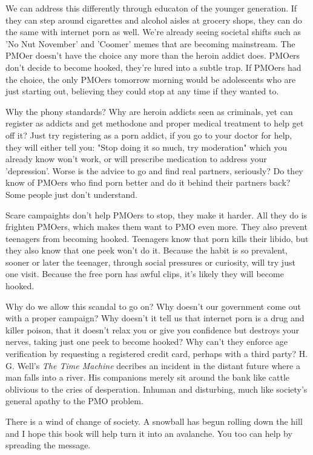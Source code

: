 \documentclass[easypeasy.tex]{subfiles}
\begin{document}
We can address this differently through educaton of the younger generation. If they can step around cigarettes and alcohol aisles at grocery shops, they can do the same with internet porn as well. We're already seeing societal shifts such as 'No Nut November' and 'Coomer' memes that are becoming mainstream. The PMOer doesn't have the choice any more than the heroin addict does. PMOers don't decide to become hooked, they're lured into a subtle trap. If PMOers had the choice, the only PMOers tomorrow morning would be adolescents who are just starting out, believing they could stop at any time if they wanted to.

Why the phony standards? Why are heroin addicts seen as criminals, yet can register as addicts and get methodone and proper medical treatment to help get off it? Just try registering as a porn addict, if you go to your doctor for help, they will either tell you: "Stop doing it so much, try moderation" which you already know won't work, or will prescribe medication to address your 'depression'. Worse is the advice to go and find real partners, seriously? Do they know of PMOers who find porn better and do it behind their partners back? Some people just don't understand.

Scare campaights don't help PMOers to stop, they make it harder. All they do is frighten PMOers, which makes them want to PMO even more. They also prevent teenagers from becoming hooked. Teenagers know that porn kills their libido, but they also know that one peek won't do it. Because the habit is so prevalent, sooner or later the teenager, through social pressures or curiosity, will try just one visit. Because the free porn has awful clips, it's likely they will become hooked.

Why do we allow this scandal to go on? Why doesn't our government come out with a proper campaign? Why doesn't it tell us that internet porn is a drug and killer poison, that it doesn't relax you or give you confidence but destroys your nerves, taking just one peek to become hooked? Why can't they enforce age verification by requesting a registered credit card, perhaps with a third party? H. G. Well's \textit{The Time Machine} decribes an incident in the distant future where a man falls into a river. His companions merely sit around the bank like cattle oblivious to the cries of desperation. Inhuman and disturbing, much like society's general apathy to the PMO problem.

There is a wind of change of society. A snowball has begun rolling down the hill and I hope this book will help turn it into an avalanche. You too can help by spreading the message.
\end{document}
